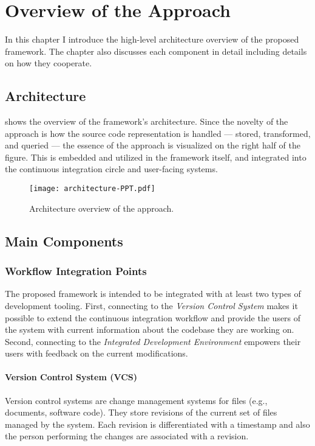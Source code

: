 \chapter{Overview of the Approach}
\label{chap:overview-of-the-approach}

In this chapter I introduce the high-level architecture overview of the proposed framework. The chapter also discusses each component in detail including details on how they cooperate.

\section{Architecture}
\label{sect:architecture}
 shows the overview of the framework's architecture. Since the novelty of the approach is how the source code representation is handled --- stored, transformed, and queried --- the essence of the approach is visualized on the right half of the figure. This is embedded and utilized in the framework itself, and integrated into the continuous integration circle and user-facing systems.

\begin{figure}[!htb]
  \centering
  \texttt{[image: architecture-PPT.pdf]}
  \caption{Architecture overview of the approach.}
  \label{fig:architecture-overview}
\end{figure}


\section{Main Components}

\subsection{Workflow Integration Points}
The proposed framework is intended to be integrated with at least two types of development tooling. First, connecting to the \emph{Version Control System} makes it possible to extend the continuous integration workflow and provide the users of the system with current information about the codebase they are working on. Second, connecting to the \emph{Integrated Development Environment} empowers their users with feedback on the current modifications.

\subsubsection{Version Control System (VCS)}
Version control systems are change management systems for files (e.g., documents, software code). They store revisions of the current set of files managed by the system. Each revision is differentiated with a timestamp and also the person performing the changes are associated with a revision.

